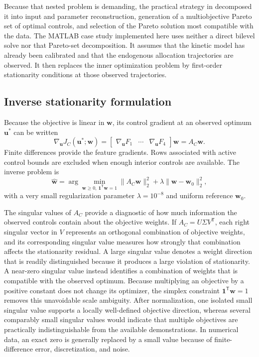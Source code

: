 \documentclass[11pt,a4paper]{article}
\newcommand{\vect}[1]{\boldsymbol{#1}}
\begin{document}
Because that nested problem is demanding, the practical strategy in
\cite{Tsiantis2018} decomposed it into input and parameter reconstruction,
generation of a multiobjective Pareto set of optimal controls, and selection
of the Pareto solution most compatible with the data. The MATLAB case study
implemented here uses neither a direct bilevel solve nor that Pareto-set
decomposition. It assumes that the kinetic model has already been calibrated
and that the endogenous allocation trajectories are observed. It then replaces
the inner optimization problem by first-order stationarity conditions at those
observed trajectories.

\subsection{Inverse stationarity formulation}

Because the objective is linear in \(\vect{w}\), its control gradient at an
observed optimum \(\vect{u}^{*}\) can be written
\begin{equation}
  \nabla_{\vect{u}}J_C(\vect{u}^{*};\vect{w})
  =
  \begin{bmatrix}
    \nabla_{\vect{u}}F_1 &
    \cdots &
    \nabla_{\vect{u}}F_4
  \end{bmatrix}
  \vect{w}
  = A_C\vect{w}.
\end{equation}
Finite differences provide the feature gradients. Rows associated with active
control bounds are excluded when enough interior controls are available. The
inverse problem is
\begin{equation}
  \hat{\vect{w}} =
  \arg\min_{\vect{w}\ge0,\ \vect{1}^{\mathsf T}\vect{w}=1}
  \|A_C\vect{w}\|_2^2
  +\lambda\|\vect{w}-\vect{w}_0\|_2^2,
\end{equation}
with a very small regularization parameter
\(\lambda=10^{-8}\) and uniform reference \(\vect{w}_0\).

The singular values of \(A_C\) provide a diagnostic of how much information
the observed controls contain about the objective weights. If
\(A_C=U\Sigma V^{\mathsf T}\), each right singular vector in \(V\) represents
an orthogonal combination of objective weights, and its corresponding singular
value measures how strongly that combination affects the stationarity
residual. A large singular value denotes a weight direction that is readily
distinguished because it produces a large violation of stationarity. A
near-zero singular value instead identifies a combination of weights that is
compatible with the observed optimum. Because multiplying an objective by a
positive constant does not change its optimizer, the simplex constraint
\(\vect{1}^{\mathsf T}\vect{w}=1\) removes this unavoidable scale ambiguity.
After normalization, one isolated small singular value supports a locally
well-defined objective direction, whereas several comparably small singular
values would indicate that multiple objectives are practically
indistinguishable from the available demonstrations. In numerical data, an
exact zero is generally replaced by a small value because of finite-difference
error, discretization, and noise.
\end{document}
